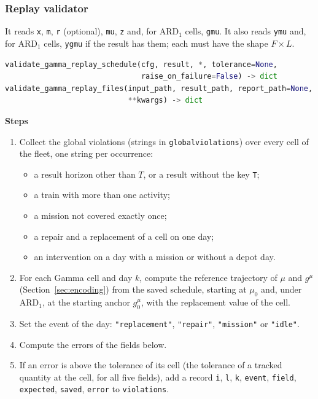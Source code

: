 \documentclass[11pt,a4paper]{article}
\theoremstyle{plain}
\theoremstyle{definition}
\newcommand{\ARDone}{\mathrm{ARD}_{1}}
\newcommand{\blockhead}[1]{\par\noindent\textbf{#1}\par\nobreak}
\renewcommand{\_}{\textunderscore\allowbreak{}}
\begin{document}
\subsubsection{Replay validator}

It reads \texttt{x}, \texttt{m}, \texttt{r} (optional), \texttt{mu}, \texttt{z} and, for $\ARDone$ cells, \texttt{g\_mu}. It also reads \texttt{y\_mu} and, for $\ARDone$ cells, \texttt{y\_g\_mu} if the result has them; each must have the shape $F \times L$.

\begin{lstlisting}[language=Python]
validate_gamma_replay_schedule(cfg, result, *, tolerance=None,
                               raise_on_failure=False) -> dict
validate_gamma_replay_files(input_path, result_path, report_path=None,
                            **kwargs) -> dict
\end{lstlisting}

\blockhead{Steps}
\begin{enumerate}[nosep,label=\arabic*.]
  \item Collect the global violations (strings in \texttt{global\_violations}) over every cell of the fleet, one string per occurrence:
  \begin{itemize}[nosep]
    \item a result horizon other than $T$, or a result without the key \texttt{T};
    \item a train with more than one activity;
    \item a mission not covered exactly once;
    \item a repair and a replacement of a cell on one day;
    \item an intervention on a day with a mission or without a depot day.
  \end{itemize}
  \item For each Gamma cell and day $k$, compute the reference trajectory of $\mu$ and $g^{\mu}$ (Section~\ref{sec:encoding}) from the saved schedule, starting at $\mu_0$ and, under $\ARDone$, at the starting anchor $g^{\mu}_0$, with the replacement value of the cell.
  \item Set the event of the day: \texttt{"replacement"}, \texttt{"repair"}, \texttt{"mission"} or \texttt{"idle"}.
  \item Compute the errors of the fields below.
  \item If an error is above the tolerance of its cell (the tolerance of a tracked quantity at the cell, for all five fields), add a record \texttt{i}, \texttt{l}, \texttt{k}, \texttt{event}, \texttt{field}, \texttt{expected}, \texttt{saved}, \texttt{error} to \texttt{violations}.
\end{enumerate}
\end{document}
